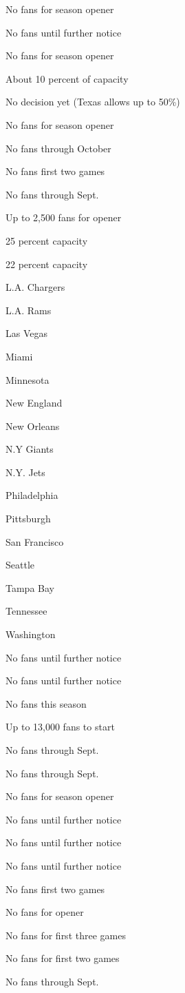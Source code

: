 No fans for season opener

No fans until further notice

No fans for season opener

About 10 percent of capacity

No decision yet (Texas allows up to 50\%)

No fans for season opener

No fans through October

No fans first two games

No fans through Sept.

Up to 2,500 fans for opener

25 percent capacity

22 percent capacity

L.A. Chargers

L.A. Rams

Las Vegas

Miami

Minnesota

New England

New Orleans

N.Y Giants

N.Y. Jets

Philadelphia

Pittsburgh

San Francisco

Seattle

Tampa Bay

Tennessee

Washington

No fans until further notice

No fans until further notice

No fans this season

Up to 13,000 fans to start

No fans through Sept.

No fans through Sept.

No fans for season opener

No fans until further notice

No fans until further notice

No fans until further notice

No fans first two games

No fans for opener

No fans for first three games

No fans for first two games

No fans through Sept.

